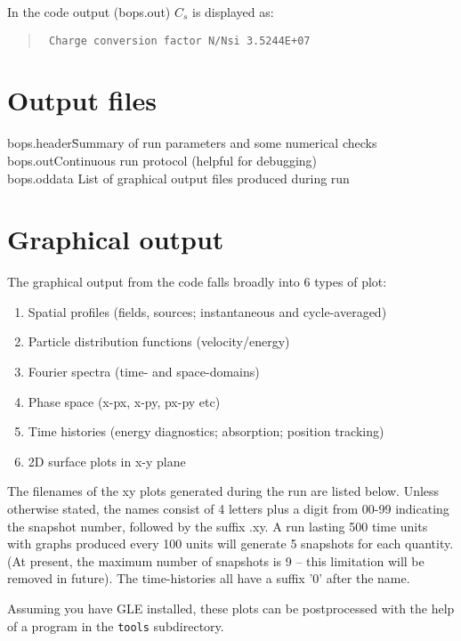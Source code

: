 \documentclass[11pt]{article}
\begin{document}
\noindent In the code output (bops.out) $C_s$ is displayed as:
\begin{quote}
\texttt{
Charge conversion factor N/Nsi   3.5244E+07
}
\end{quote}

\section{Output files} 

\begin{tabbing}
 bops.header\hspace{1cm}\=Summary of run parameters and some numerical checks \\
 bops.out\>Continuous run protocol (helpful for debugging)\\ 
 bops.oddata\> List of graphical output files produced during run 
\end{tabbing}

\section{Graphical output} 

The graphical output from the code falls broadly into 6 types of plot: 
\begin{enumerate}
\item Spatial profiles (fields, sources; instantaneous and cycle-averaged) 
\item Particle distribution functions (velocity/energy) 
\item Fourier spectra (time- and space-domains) 
\item Phase space (x-px, x-py, px-py etc) 
\item Time histories (energy diagnostics; absorption; position tracking) 
\item 2D surface plots in x-y plane 
\end{enumerate}

The filenames of the xy plots generated during the run are listed below. Unless otherwise stated, the names consist of 4 letters plus a digit from 00-99 indicating the snapshot number, followed by the suffix .xy. A run lasting 500 time units with graphs produced every 100 units will generate 5 snapshots for each quantity. (At present, the maximum number of snapshots is 9 -- this limitation will be removed in future). The time-histories all have a suffix '0' after the name. 

Assuming you have GLE installed, these plots can be postprocessed with the help of a program in the \texttt{tools} subdirectory.
\end{document}
